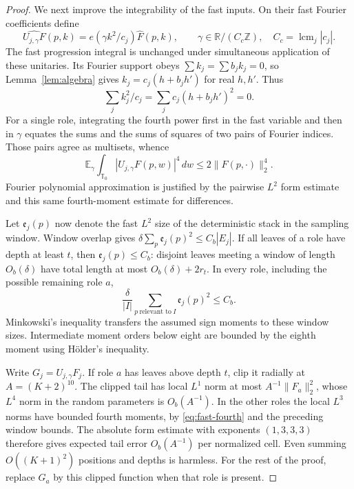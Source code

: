\begin{proof}
We next improve the integrability of the fast inputs.  On their fast
Fourier coefficients define
\[
 \widehat{U_{j,\gamma}F}(p,k)
   =e(\gamma k^2/c_j)\widehat F(p,k),
 \qquad \gamma\in\mathbb R/(C_c\mathbb Z),
 \quad C_c=\operatorname{lcm}_j|c_j|.
\]
The fast progression integral is unchanged under simultaneous
application of these unitaries.  Its Fourier support obeys
\(\sum k_j=\sum b_jk_j=0\), so Lemma~\ref{lem:algebra} gives
\(k_j=c_j(h+b_jh')\) for real \(h,h'\).  Thus
\[
 \sum_j k_j^2/c_j=\sum_jc_j(h+b_jh')^2=0.
\]
For a single role, integrating the fourth power first in the fast
variable and then in \(\gamma\) equates the sums and the sums of
squares of two pairs of Fourier indices.  Those pairs agree as
multisets, whence
\begin{equation}\label{eq:fast-fourth}
 \mathbb E_\gamma\int_{\mathbb T_0}|U_{j,\gamma}F(p,w)|^4\,dw
 \le2\|F(p,\cdot)\|_2^4.
\end{equation}
Fourier polynomial approximation is justified by the pairwise
\(L^2\) form estimate and this same fourth-moment estimate for differences.

Let \(\mathfrak e_j(p)\) now denote the fast \(L^2\) size of the deterministic
stack in the sampling window.  Window overlap gives
\(\delta\sum_p \mathfrak e_j(p)^2\le C_b|E_j|\).
If all leaves of a role have depth at least \(t\), then
\(\mathfrak e_j(p)\le C_b\): disjoint leaves meeting a window of length
\(O_b(\delta)\) have total length at most \(O_b(\delta)+2r_t\).
In every role, including the possible remaining role \(a\),
\[
 \frac{\delta}{|I|}\sum_{p\ \text{relevant to}\ I}\mathfrak e_j(p)^2\le C_b.
\]
Minkowski's inequality transfers the assumed sign moments to these
window sizes.  Intermediate moment orders below eight are bounded
by the eighth moment using H\"older's inequality.

Write \(G_j=U_{j,\gamma}F_j\).  If role \(a\) has leaves above
depth \(t\), clip it radially at \(A=(K+2)^{10}\).  The clipped tail
has local \(L^1\) norm at most \(A^{-1}\|F_a\|_2^2\), whose
\(L^4\) norm in the random parameters is \(O_b(A^{-1})\).
In the other roles the local
\(L^3\) norms have bounded fourth moments, by
\eqref{eq:fast-fourth} and the preceding window bounds.  The absolute
form estimate with exponents \((1,3,3,3)\) therefore gives expected
tail error \(O_b(A^{-1})\) per normalized cell.  Even summing
\(O((K+1)^2)\) positions and depths is harmless.
For the rest of the proof, replace \(G_a\) by this clipped function
when that role is present.


\end{proof}
